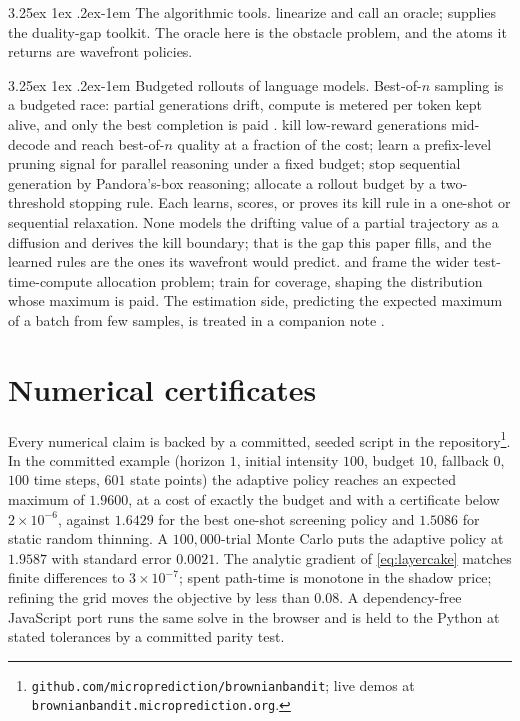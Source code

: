 \documentclass[11pt]{article}
\makeatletter
\renewcommand\paragraph{\@startsection{paragraph}{4}{\z@}%
  {3.25ex \@plus1ex \@minus.2ex}{-1em}%
  {\normalfont\normalsize\itshape}}
\theoremstyle{itheads}
\makeatother
\begin{document}
\paragraph{The algorithmic tools.}
\citet{frank1956} linearize and call an oracle; \citet{jaggi2013}
supplies the duality-gap toolkit. The oracle here is the obstacle
problem, and the atoms it returns are wavefront policies.

\paragraph{Budgeted rollouts of language models.}
Best-of-$n$ sampling is a budgeted race: partial generations drift,
compute is metered per token kept alive, and only the best completion is
paid \citep{chen2021}. \citet{sun2024} kill low-reward generations
mid-decode and reach best-of-$n$ quality at a fraction of the cost;
\citet{bi2026} learn a prefix-level pruning signal for parallel
reasoning under a fixed budget; \citet{kalayci2025} stop sequential
generation by Pandora's-box reasoning; \citet{nomand2026} allocate a
rollout budget by a two-threshold stopping rule. Each learns, scores,
or proves its kill rule in a one-shot or sequential relaxation. None
models the drifting value of a partial trajectory as a diffusion and
derives the kill boundary; that is the gap this paper fills, and the
learned rules are the ones its wavefront would predict.
\citet{yao2023} and \citet{snell2024} frame the wider test-time-compute
allocation problem; \citet{malladi2026} train for coverage, shaping the
distribution whose maximum is paid. The estimation side, predicting the
expected maximum of a batch from few samples, is treated in a companion
note \citep{cotton2026passk}.

\section{Numerical certificates}

Every numerical claim is backed by a committed, seeded script in the
repository\footnote{\texttt{github.com/microprediction/brownianbandit};
live demos at \texttt{brownianbandit.microprediction.org}.}. In the
committed example (horizon $1$, initial intensity $100$, budget $10$,
fallback $0$, $100$ time steps, $601$ state points) the adaptive policy
reaches an expected maximum of $1.9600$, at a cost of exactly the
budget and with a certificate below $2 \times 10^{-6}$, against
$1.6429$ for the best one-shot screening policy and $1.5086$ for static
random thinning. A $100{,}000$-trial Monte Carlo puts the adaptive
policy at $1.9587$ with standard error $0.0021$. The analytic gradient of \eqref{eq:layercake}
matches finite differences to $3 \times 10^{-7}$; spent path-time is
monotone in the shadow price; refining the grid moves the objective by
less than $0.08$. A dependency-free JavaScript port runs the same solve
in the browser and is held to the Python at stated tolerances by a
committed parity test.
\end{document}
